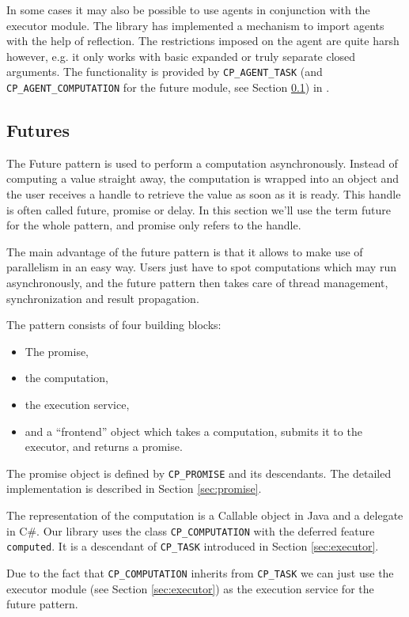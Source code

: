 In some cases it may also be possible to use agents in conjunction with the executor module.
The library has implemented a mechanism to import agents with the help of reflection.
The restrictions imposed on the agent are quite harsh however, e.g. it only works with basic expanded or truly separate closed arguments.
The functionality is provided by \lstinline!CP_AGENT_TASK! (and \lstinline!CP_AGENT_COMPUTATION! for the future module, see Section \ref{sec:futures}) in .

\subsection{Futures}
\label{sec:futures}

The Future pattern  is used to perform a computation asynchronously.
Instead of computing a value straight away, the computation is wrapped into an object and the user receives a handle to retrieve the value as soon as it is ready.
This handle is often called future, promise or delay.
In this section we'll use the term future for the whole pattern, and promise only refers to the handle.

The main advantage of the future pattern is that it allows to make use of parallelism in an easy way.
Users just have to spot computations which may run asynchronously, and the future pattern then takes care of thread management, synchronization and result propagation.

The pattern consists of four building blocks:
\begin{itemize}
 \item The promise,
 \item the computation,
 \item the execution service,
 \item and a ``frontend'' object which takes a computation, submits it to the executor, and returns a promise.
\end{itemize}

The promise object is defined by \lstinline!CP_PROMISE! and its descendants.
The detailed implementation is described in Section \ref{sec:promise}.

The representation of the computation is a Callable object in Java and a delegate in C\#.
Our library uses the class \lstinline!CP_COMPUTATION! with the deferred feature \lstinline!computed!.
It is a descendant of \lstinline!CP_TASK! introduced in Section \ref{sec:executor}.

Due to the fact that \lstinline!CP_COMPUTATION! inherits from \lstinline!CP_TASK! we can just use the executor module (see Section \ref{sec:executor}) as the execution service for the future pattern.

